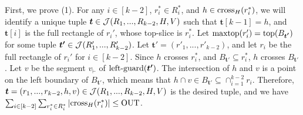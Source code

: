 First, we prove (1). For any $i \in [k-2]$, $r_i^*\in R_i^*$, and $h \in \mathrm{cross}_H(r_i^*)$, we will identify a unique tuple $\textrm{\boldmath${t}$} \in \mathcal{J}(R_1,...,R_{k-2},H,V)$ such that $\bm{t}[k-1] = h$, and $\bm{t}[i]$ is the full rectangle of $r_i'$, whose top-slice is $r_i^*$. Let $\mathrm{maxtop}(r_i') = \mathrm{top}(B_{\textrm{\boldmath${t'}$}})$ for some tuple $\textrm{\boldmath${t'}$} \in \mathcal{J}(R_1',...,R_{k-2}')$. Let $\bm{t'} = (r'_1,...,r'_{k-2})$, and let $r_i$ be the full rectangle of $r_i'$ for $i \in [k-2]$. Since $h$ crosses $r_i^*$, and $B_\bm{t'} \subseteq r_i^*$, $h$ crosses $B_{\bm{t'}}$. Let $v$ be the segment $v_\vdash$ of $\mathrm{left\text{-}guard}(\textrm{\boldmath${t'}$})$. The intersection of $h$ and $v$ is a point on the left boundary of $B_{\bm{t'}}$, which means that $h\cap v \in B_{\bm{t'}} \subseteq \cap_{i = 1}^{k-2}r_i$. Therefore, $\textrm{\boldmath${t}$} = (r_1,...,r_{k-2},h,v)\in \mathcal{J}(R_1,...,R_{k-2},H,V)$ is the desired tuple, and we have $\sum_{i \in [k-2]}\sum_{r_i^*\in R_i^*} |\mathrm{cross}_H(r_i^*)| \leq \mathrm{OUT}$.